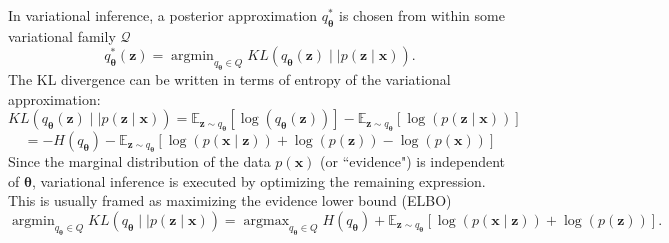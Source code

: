 \documentclass[11pt]{article}
\DeclareMathOperator*{\argmin}{argmin}
\DeclareMathOperator*{\argmax}{argmax}
\begin{document}
In variational inference, a posterior approximation $q_{\bm{\theta}}^*$ is chosen from within some variational family $\mathcal{Q}$
\begin{equation}
q_{\bm{\theta}}^*(\mathbf{z}) = \argmin_{q_{\bm{\theta}} \in Q} KL(q_{\bm{\theta}}(\mathbf{z}) \mid \mid p(\mathbf{z} \mid \mathbf{x})).
\end{equation}
The KL divergence can be written in terms of entropy of the variational approximation:
\begin{equation}
KL(q_{\bm{\theta}}(\mathbf{z})  \mid \mid p(\mathbf{z} \mid \mathbf{x})) = \mathbb{E}_{\mathbf{z} \sim q_{\bm{\theta}}} \left[ \log (q_{\bm{\theta}}(\mathbf{z})) \right] - \mathbb{E}_{\mathbf{z} \sim q_{\bm{\theta}}} \left[ \log (p(\mathbf{z} \mid \mathbf{x})) \right]
\end{equation}
\begin{equation}
= -H(q_{\bm{\theta}}) - \mathbb{E}_{\mathbf{z} \sim q_{\bm{\theta}}} \left[ \log (p(\mathbf{x} \mid \mathbf{z}))  + \log(p(\mathbf{z})) - \log(p(\mathbf{x}))\right]
\end{equation}
Since the marginal distribution of the data $p(\mathbf{x})$ (or ``evidence") is independent of $\bm{\theta}$, variational inference is executed by optimizing the remaining expression.
This is usually framed as maximizing the evidence lower bound (ELBO)
\begin{equation}
\argmin_{q_{\bm{\theta}} \in Q} KL(q_{\bm{\theta}} \mid \mid p(\mathbf{z} \mid \mathbf{x})) = \argmax_{q_{\bm{\theta}} \in Q} H(q_{\bm{\theta}}) + \mathbb{E}_{\mathbf{z} \sim q_{\bm{\theta}}} \left[ \log (p(\mathbf{x} \mid \mathbf{z}))  + \log(p(\mathbf{z}))\right].
\end{equation}
\end{document}
